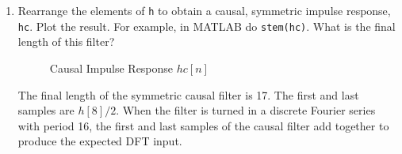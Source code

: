 \documentclass[fleqn]{article}
\begin{document}
\begin{enumerate}
\begin{enumerate}[nolistsep]
			\item Rearrange the elements of \texttt{h} to obtain a causal, symmetric impulse response, \texttt{hc}. Plot the result. For example, in MATLAB do \texttt{stem(hc)}. What is the final length of this filter?
			
			\begin{figure}[H]
				\centerline{}
				\caption{Causal Impulse Response $hc[n]$}
			\end{figure}
			
			The final length of the symmetric causal filter is 17. The first and last samples are $h[8]/2$. When the filter is turned in a discrete Fourier series with period 16, the first and last samples of the causal filter add together to produce the expected DFT input. 
		\end{enumerate}
	\end{enumerate}
	
	
	
\end{document}
